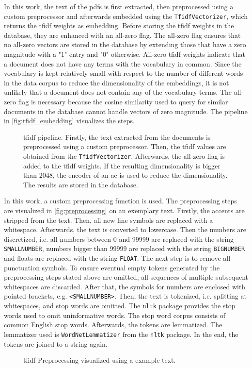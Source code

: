 In this work, the text of the \acp{pdf} is first extracted, then preprocessed using a custom preprocessor and afterwards embedded using the \texttt{TfidfVectorizer},
which returns the \ac{tfidf} weights as embedding.
Before storing the \ac{tfidf} weights in the database, they are enhanced with an all-zero flag.
The all-zero flag ensures that no all-zero vectors are stored in the database by extending those that have a zero magnitude with a "1" entry and "0" otherwise.
All-zero \ac{tfidf} weights indicate that a document does not have any terms with the vocabulary in common.
Since the vocabulary is kept relatively small with respect to the number of different words in the data corpus to reduce the dimensionality of the embeddings, 
it is not unlikely that a document does not contain any of the vocabulary terms.
The all-zero flag is necessary because the cosine similarity used to query for similar documents in the database cannot handle vectors of zero magnitude.
The pipeline in \autoref{fig:tfidf_embedding} visualizes the steps.

\begin{figure}[h] %
    \centering
    
    \caption[\ac{tfidf} pipeline]{\ac{tfidf} pipeline.
    Firstly, the text extracted from the documents is preprocessed using a custom preprocessor.
    Then, the \ac{tfidf} values are obtained from the \texttt{TfidfVectorizer}.
    Afterwards, the all-zero flag is added to the \ac{tfidf} weights.
    If the resulting dimensionality is bigger than 2048, the encoder of an \ac{ae} is used to reduce the dimensionality.
    The results are stored in the database.
    }
    \label{fig:tfidf_embedding}
\end{figure}

In this work, a custom preprocessing function is used.
The preprocessing steps are visualized in \autoref{fig:preprocessing} on an exemplary text.
Firstly, the accents are stripped from the text.
Then, all new line symbols are replaced with a whitespace.
Afterwards, the text is converted to lowercase.
Then the numbers are discretized, i.e. all numbers between 0 and 99999 are replaced with the string \texttt{SMALLNUMBER}, 
numbers bigger than 99999 are replaced with the string \texttt{BIGNUMBER} and floats are replaced with the string \texttt{FLOAT}.
The next step is to remove all punctuation symbols.
To ensure eventual empty tokens generated by the preprocessing steps stated above are omitted, 
all sequences of multiple subsequent whitespaces are discarded.
After that, the symbols for numbers are enclosed with pointed brackets, e.g. \texttt{<SMALLNUMBER>}.
Then, the text is tokenized, i.e. splitting at whitespaces, and stop words are omitted.
The \texttt{nltk} package provides the stop words used to omit uninformative words.
The stop word corpus consists of common English stop words.
Afterwards, the tokens are lemmatized.
The lemmatizer used is \texttt{WordNetLemmatizer} from the \texttt{nltk} package.
In the end, the tokens are joined to a string again.


\begin{figure}[htp] %
    \centering
    
    \caption{\ac{tfidf} Preprocessing visualized using a example text.}
    \label{fig:preprocessing}
\end{figure}